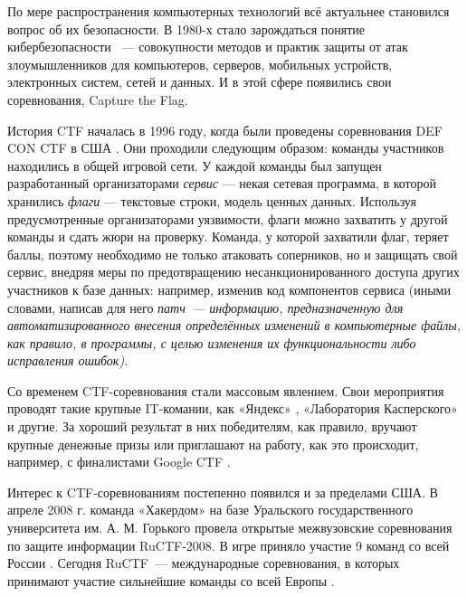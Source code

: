 По мере распространения компьютерных технологий всё актуальнее становился вопрос об их безопасности. В 1980-х стало зарождаться понятие кибербезопасности \cite{InfosecHistory}~--- совокупности методов и практик защиты от атак злоумышленников для компьютеров, серверов, мобильных устройств, электронных систем, сетей и данных. И в этой сфере появились свои соревнования, Capture the Flag.



История CTF началась в 1996 году, когда были проведены соревнования DEF CON CTF в США \cite{defcon}. Они проходили следующим образом: команды участников находились в общей игровой сети. У каждой команды был запущен разработанный организаторами \textit{сервис} — некая сетевая программа, в которой хранились \textit{флаги} — текстовые строки, модель ценных данных. Используя предусмотренные организаторами уязвимости, флаги можно захватить у другой команды и сдать жюри на проверку. Команда, у которой захватили флаг, теряет баллы, поэтому необходимо не только атаковать соперников, но и защищать свой сервис, внедряя меры по предотвращению несанкционированного доступа других участников к базе данных: например, изменив код компонентов сервиса (иными словами, написав для него \textit{патч~--- информацию, предназначенную для автоматизированного внесения определённых изменений в компьютерные файлы, как правило, в программы, с целью изменения их функциональности либо исправления ошибок).}


Со временем CTF-соревнования стали массовым явлением. Свои мероприятия проводят такие крупные IT-комании, как «Яндекс» \cite{YaCTF}, «Лаборатория Касперского» \cite{KasperskyCTF} и другие. За хороший результат в них победителям, как правило, вручают крупные денежные призы или приглашают на работу, как это происходит, например, с финалистами Google CTF \cite{GoogleCTF}.

Интерес к CTF-соревнованиям постепенно появился и за пределами США. В апреле 2008 г. команда «Хакердом» на базе Уральского государственного университета им. А. М. Горького провела открытые межвузовские соревнования по защите информации RuCTF-2008. В игре приняло участие 9 команд со всей России \cite{Hackerdom08}. Сегодня RuCTF~--- международные соревнования, в которых принимают участие сильнейшие команды со всей Европы \cite{Hackerdom20}.

